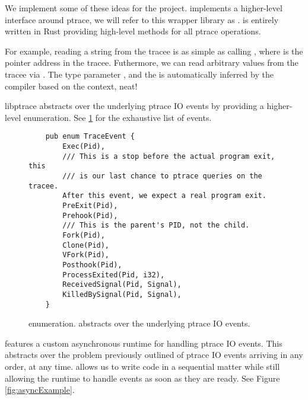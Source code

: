 We implement some of these ideas for the \pc project. \pc implements a higher-level interface around ptrace, we will refer to this wrapper library as .  is entirely written in Rust providing high-level methods for all ptrace operations.

For example, reading a string from the tracee is as simple as calling , where  is the pointer address in the tracee. Futhermore, we can read arbitrary values from the tracee via . The type parameter , and the  is automatically inferred by the compiler based on the context, neat!

libptrace abstracts over the underlying ptrace IO events by providing a higher-level enumeration. See \ref{fig:trace-event} for the exhaustive list of events.

\begin{figure}[hbtp]
    \begin{lstlisting}
    pub enum TraceEvent {
        Exec(Pid),
        /// This is a stop before the actual program exit, this
        /// is our last chance to ptrace queries on the tracee.
        After this event, we expect a real program exit.
        PreExit(Pid),
        Prehook(Pid),
        /// This is the parent's PID, not the child.
        Fork(Pid),
        Clone(Pid),
        VFork(Pid),
        Posthook(Pid),
        ProcessExited(Pid, i32),
        ReceivedSignal(Pid, Signal),
        KilledBySignal(Pid, Signal),
    }
    \end{lstlisting}
    \caption{  enumeration.  abstracts over the underlying ptrace IO events.}
    \label{fig:trace-event}
\end{figure}

 features a custom asynchronous runtime for handling ptrace IO events. This abstracts over the problem previously outlined of ptrace IO events arriving in any order, at any time.  allows us to write code in a sequential matter while still allowing the runtime to handle events as soon as they are ready. See Figure \ref{fig:asyncExample}.

